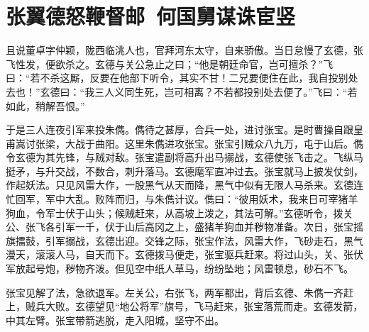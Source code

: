 \documentclass[a4paper]{article}
\begin{document}
\newpage
\section*{张翼德怒鞭督邮\ 何国舅谋诛宦竖}

且说董卓字仲颖，陇西临洮人也，官拜河东太守，自来骄傲。当日怠慢了玄德，张飞性发，便欲杀之。玄德与关公急止之曰；“他是朝廷命官，岂可擅杀？”飞曰：“若不杀这厮，反要在他部下听令，其实不甘！二兄要便住在此，我自投别处去也！”玄德曰：“我三人义同生死，岂可相离？不若都投别处去便了。”飞曰：“若如此，稍解吾恨。”

于是三人连夜引军来投朱儁。儁待之甚厚，合兵一处，进讨张宝。是时曹操自跟皇甫嵩讨张梁，大战于曲阳。这里朱儁进攻张宝。张宝引贼众八九万，屯于山后。儁令玄德为其先锋，与贼对敌。张宝遣副将高升出马搦战，玄德使张飞击之。飞纵马挺矛，与升交战，不数合，刺升落马。玄德麾军直冲过去。张宝就马上披发仗剑，作起妖法。只见风雷大作，一股黑气从天而降，黑气中似有无限人马杀来。玄德连忙回军，军中大乱。败阵而归，与朱儁计议。儁曰：“彼用妖术，我来日可宰猪羊狗血，令军士伏于山头；候贼赶来，从高坡上泼之，其法可解。”玄德听令，拨关公、张飞各引军一千，伏于山后高冈之上，盛猪羊狗血并秽物准备。次日，张宝摇旗擂鼓，引军搦战，玄德出迎。交锋之际，张宝作法，风雷大作，飞砂走石，黑气漫天，滚滚人马，自天而下。玄德拨马便走，张宝驱兵赶来。将过山头，关、张伏军放起号炮，秽物齐泼。但见空中纸人草马，纷纷坠地；风雷顿息，砂石不飞。

张宝见解了法，急欲退军。左关公，右张飞，两军都出，背后玄德、朱儁一齐赶上，贼兵大败。玄德望见“地公将军”旗号，飞马赶来，张宝落荒而走。玄德发箭，中其左臂。张宝带箭逃脱，走入阳城，坚守不出。
\end{document}
